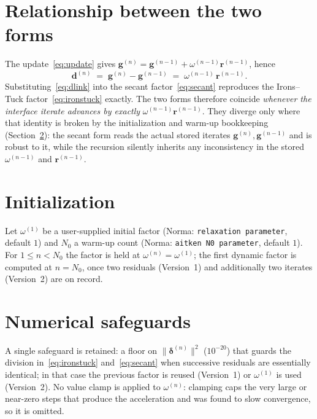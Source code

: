 \documentclass[11pt]{article}
\begin{document}
\section{Relationship between the two forms}
\label{sec:equiv}

The update~\eqref{eq:update} gives
$\bm{g}^{(n)} = \bm{g}^{(n-1)} + \omega^{(n-1)}\bm{r}^{(n-1)}$, hence
\begin{equation}
    \bm{d}^{(n)} \;=\; \bm{g}^{(n)} - \bm{g}^{(n-1)}
                 \;=\; \omega^{(n-1)}\,\bm{r}^{(n-1)} .
    \label{eq:dlink}
\end{equation}
Substituting~\eqref{eq:dlink} into the secant factor~\eqref{eq:secant}
reproduces the Irons--Tuck factor~\eqref{eq:ironstuck} exactly. The two forms
therefore coincide \emph{whenever the interface iterate advances by exactly}
$\omega^{(n-1)}\bm{r}^{(n-1)}$. They diverge only where that identity is broken
by the initialization and warm-up bookkeeping (Section~\ref{sec:init}): the
secant form reads the actual stored iterates $\bm{g}^{(n)},\bm{g}^{(n-1)}$ and
is robust to it, while the recursion silently inherits any inconsistency in the
stored $\omega^{(n-1)}$ and $\bm{r}^{(n-1)}$.

\section{Initialization}
\label{sec:init}

Let $\omega^{(1)}$ be a user-supplied initial factor (Norma:
\texttt{relaxation parameter}, default $1$) and $N_0$ a warm-up count (Norma:
\texttt{aitken N0 parameter}, default $1$). For $1 \le n < N_0$ the factor is
held at $\omega^{(n)} = \omega^{(1)}$; the first dynamic factor is computed at
$n = N_0$, once two residuals (Version~1) and additionally two iterates
(Version~2) are on record.

\section{Numerical safeguards}

A single safeguard is retained: a floor on
$\lVert\bm{\delta}^{(n)}\rVert^{2}$ ($10^{-20}$) that guards the division
in~\eqref{eq:ironstuck} and~\eqref{eq:secant} when successive residuals are
essentially identical; in that case the previous factor is reused (Version~1)
or $\omega^{(1)}$ is used (Version~2). No value clamp is applied to
$\omega^{(n)}$: clamping caps the very large or near-zero steps that produce
the acceleration and was found to slow convergence, so it is omitted.
\end{document}
